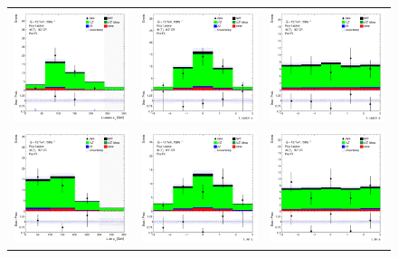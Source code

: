 \begin{figure}[htbp]
\centering
  \begin{tabular}{ccc}


    \includegraphics[width=.25\textwidth]{figures/PreFitPlots/lep4_ttZ_4T_L_lepton_pt.png} &
    \includegraphics[width=.25\textwidth]{figures/PreFitPlots/lep4_ttZ_4T_L_lepton_eta.png} &
    \includegraphics[width=.25\textwidth]{figures/PreFitPlots/lep4_ttZ_4T_L_lepton_phi.png} \\
    \includegraphics[width=.25\textwidth]{figures/PreFitPlots/lep4_ttZ_4T_LJet_pt.png} &
    \includegraphics[width=.25\textwidth]{figures/PreFitPlots/lep4_ttZ_4T_LJet_eta.png} &
    \includegraphics[width=.25\textwidth]{figures/PreFitPlots/lep4_ttZ_4T_LJet_phi.png} \\


\end{tabular}
\end{figure}
